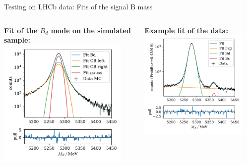 \documentclass[aspectratio=1610, 10pt]{beamer}
\begin{document}
\begin{frame}{Testing on LHCb data: Fits of the signal B mass}
  \begin{columns}
    \begin{column}{0.5\textwidth}
      \centering
      \textbf{Fit of the $B_d$ mode on the simulated sample:}
      \includegraphics[width=0.9\textwidth]{images/fit_mc.pdf}
    \end{column}
    \begin{column}{0.5\textwidth}
      \centering
      \textbf{Example fit of the data:}
      \includegraphics[width=0.9\textwidth]{images/fit_example.pdf}
    \end{column}
  \end{columns}
\end{frame}
\end{document}
